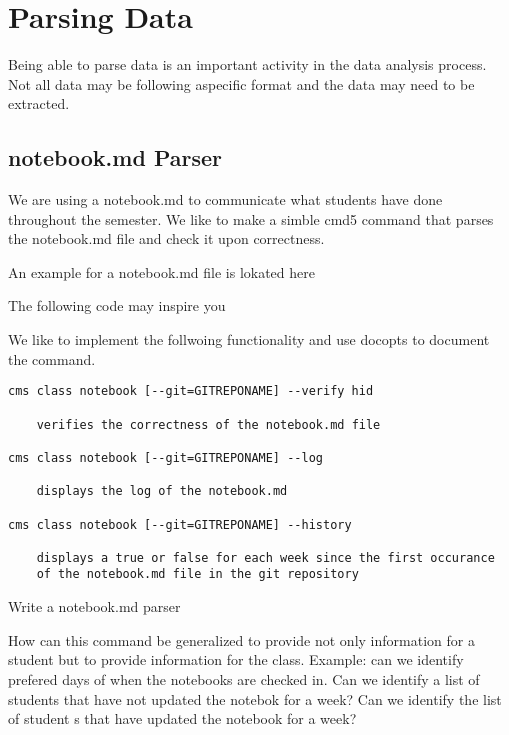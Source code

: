 \section{Parsing Data}

Being able to parse data is an important activity in the data analysis
process. Not all data may be following aspecific format and the data
may need to be extracted.


\subsection{notebook.md Parser}

We are using a notebook.md to communicate what students have done
throughout the semester. We like to make a simble cmd5 command that
parses the notebook.md file and check it upon correctness.

An example for a notebook.md file is lokated here 


The following code may inspire you


We like to implement the follwoing functionality and use docopts to
document the command.

\begin{lstlisting}
cms class notebook [--git=GITREPONAME] --verify hid

    verifies the correctness of the notebook.md file

cms class notebook [--git=GITREPONAME] --log

    displays the log of the notebook.md

cms class notebook [--git=GITREPONAME] --history

    displays a true or false for each week since the first occurance
    of the notebook.md file in the git repository
\end{lstlisting}

\begin{exercise}
  \label{E:notebook-md.1}
  Write a notebook.md parser
\end{exercise}

\begin{exercise}
  \label{E:notebook-md.2}
  How can this command be generalized to provide not only information
  for a student but to provide information for the class. Example: can
  we identify prefered days of when the notebooks are checked in. Can
  we identify a list of students that have not updated the notebok for
  a week?  Can we identify the list of student s that have updated the
  notebook for a week? 
\end{exercise}



